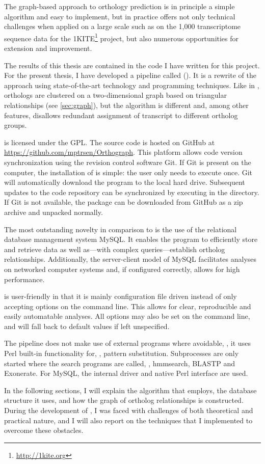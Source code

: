 The graph-based approach to orthology prediction is in principle a simple
algorithm and easy to implement, but in practice offers not only technical
challenges when applied on a large scale such as on the 1,000 transcriptome
sequence data for the 1KITE\footnote{\url{http://1kite.org}} project, but also
numerous opportunities for extension and improvement. 

The results of this thesis are contained in the code I have written for this
project. For the present thesis, I have developed a pipeline called \pname
(\pfullname). It is a rewrite of the \hamstr approach using state-of-the-art
technology and programming techniques. Like in \hamstr, orthologs are clustered
on a two-dimensional graph based on triangular relationships (see
\autoref{sec:graph}), but the algorithm is different and, among other features,
disallows redundant assignment of transcript to different ortholog groups.

\pname is licensed under the GPL. The source code is hosted on GitHub at
\url{https://github.com/mptrsen/Orthograph}. This platform allows code version
synchronization using the revision control software Git. If Git is present on
the computer, the installation of \pname is simple: the user only needs to
execute  once. Git
will automatically download the program to the local hard drive. Subsequent
updates to the code repository can be synchronized by executing 
in the \pname directory. If Git is not available, the package can be downloaded
from GitHub as a zip archive and unpacked normally.

The most outstanding novelty in comparison to \hamstr is the use of the
relational database management system MySQL. It enables the program to
efficiently store and retrieve data as well as---with complex 
queries---establish ortholog relationships. Additionally, the server-client
model of MySQL facilitates analyses on networked computer systems and, if
configured correctly, allows for high performance.

\pname is user-friendly in that it is mainly configuration file driven instead
of only accepting options on the command line. This allows for clear,
reproducible and easily automatable analyses. All options may also be set on the
command line, and will fall back to default values if left unspecified.

The pipeline does not make use of external programs where avoidable, \ie, it
uses Perl built-in functionality for, \eg, pattern substitution. Subprocesses
are only started where the search programs are called, \ie, hmmsearch, BLASTP
and Exonerate. For MySQL, the internal driver and native Perl interface are
used.

In the following sections, I will explain the algorithm that \pname employs, the
database structure it uses, and how the graph of ortholog relationships is
constructed. During the development of \pname, I was faced with challenges of
both theoretical and practical nature, and I will also report on the techniques
that I implemented to overcome these obstacles.
